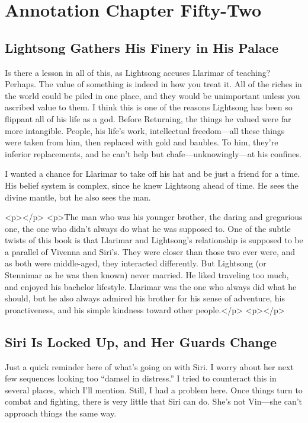 \section{Annotation Chapter Fifty-Two}

\subsection*{Lightsong Gathers His Finery in His Palace}

Is there a lesson in all of this, as Lightsong accuses Llarimar of teaching? Perhaps. The value of something is indeed in how you treat it. All of the riches in the world could be piled in one place, and they would be unimportant unless you ascribed value to them. I think this is one of the reasons Lightsong has been so flippant all of his life as a god. Before Returning, the things he valued were far more intangible. People, his life’s work, intellectual freedom—all these things were taken from him, then replaced with gold and baubles. To him, they’re inferior replacements, and he can’t help but chafe—unknowingly—at his confines.

I wanted a chance for Llarimar to take off his hat and be just a friend for a time. His belief system is complex, since he knew Lightsong ahead of time. He sees the divine mantle, but he also sees the man.



<p></p>
<p>The man who was his younger brother, the daring and gregarious one, the one who didn’t always do what he was supposed to. One of the subtle twists of this book is that Llarimar and Lightsong’s relationship is supposed to be a parallel of Vivenna and Siri’s. They were closer than those two ever were, and as both were middle-aged, they interacted differently. But Lightsong (or Stennimar as he was then known) never married. He liked traveling too much, and enjoyed his bachelor lifestyle. Llarimar was the one who always did what he should, but he also always admired his brother for his sense of adventure, his proactiveness, and his simple kindness toward other people.</p>
<p></p>

\subsection*{Siri Is Locked Up, and Her Guards Change}

Just a quick reminder here of what’s going on with Siri. I worry about her next few sequences looking too “damsel in distress.” I tried to counteract this in several places, which I’ll mention. Still, I had a problem here. Once things turn to combat and fighting, there is very little that Siri can do. She’s not Vin—she can’t approach things the same way.

